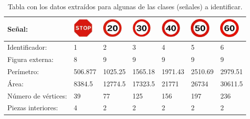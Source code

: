 \begin{table}[H]
  \begin{center}
    \begin{tabular}{|p{4cm}|p{1.5cm}|p{1.5cm}|p{1.5cm}|p{1.5cm}|p{1.5cm}|p{1.5cm}|}
      \hline
        Señal:  & \includegraphics[width=1cm]{./imagenes/1.jpg} & \includegraphics[width=1cm]{./imagenes/2.jpg}  & \includegraphics[width=1cm]{./imagenes/3.jpg} & \includegraphics[width=1cm]{./imagenes/4.jpg} &  \includegraphics[width=1cm]{./imagenes/5.jpg} &  \includegraphics[width=1cm]{./imagenes/6.jpg} \\
      \hline

      Identificador: & 1 & 2 & 3 & 4 & 5 & 6 \\
      \hline
      Figura externa:& 8 & 9 & 9 & 9 & 9 & 9 \\     
      \hline
      Perímetro:& 506.877 & 1025.25 & 1565.18 & 1971.43 & 2510.69 & 2979.51 \\
      \hline 
      Área: & 8384.5 & 12774.5 & 17323.5 & 21771 & 26734 & 30611.5 \\ 
      \hline
      Número de vértices: & 39 & 77 & 125 & 156 & 197 & 236 \\ 
      \hline
      Piezas interiores: & 4 & 2 & 2 & 2 & 2 & 2 \\
      \hline
    \end{tabular}
  \end{center}
  \caption{Tabla con los datos extraídos para algunas de las clases (señales) a identificar.}
  \label{table:tabla-modelos}
\end{table}

